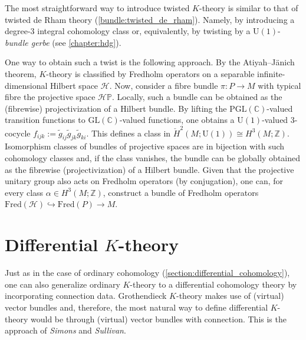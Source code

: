    The most straightforward way to introduce twisted $K$-theory is similar to that of twisted de Rham theory (\cref{bundle:twisted_de_rham}). Namely, by introducing a degree-3 integral cohomology class or, equivalently, by twisting by a $\mathrm{U}(1)$-\textit{bundle gerbe} (see \cref{chapter:hdg}).

    One way to obtain such a twist is the following approach. By the Atiyah--J\"anich theorem, $K$-theory is classified by Fredholm operators on a separable infinite-dimensional Hilbert space $\mathcal{H}$. Now, consider a fibre bundle $\pi:P\rightarrow M$ with typical fibre the projective space $\mathcal{H}\mathbb{P}$. Locally, such a bundle can be obtained as the (fibrewise) projectivization of a Hilbert bundle. By lifting the $\mathrm{PGL}(\mathbb{C})$-valued transition functions to $\mathrm{GL}(\mathbb{C})$-valued functions, one obtains a $\mathrm{U}(1)$-valued 3-cocycle $f_{ijk}:=\widetilde{g}_{ij}\widetilde{g}_{jk}\widetilde{g}_{ki}$. This defines a class in $\check{H}^2(M;\mathrm{U}(1))\cong H^3(M;\mathbb{Z})$. Isomorphism classes of bundles of projective spaces are in bijection with such cohomology classes and, if the class vanishes, the bundle can be globally obtained as the fibrewise (projectivization) of a Hilbert bundle. Given that the projective unitary group also acts on Fredholm operators (by conjugation), one can, for every class $\alpha\in H^3(M;\mathbb{Z})$, construct a bundle of Fredholm operators $\mathrm{Fred}(\mathcal{H})\hookrightarrow\mathrm{Fred}(P)\rightarrow M$.


\section{\texorpdfstring{Differential $K$-theory}{Differential K-theory}}

    Just as in the case of ordinary cohomology (\cref{section:differential_cohomology}), one can also generalize ordinary $K$-theory to a differential cohomology theory by incorporating connection data. Grothendieck $K$-theory makes use of (virtual) vector bundles and, therefore, the most natural way to define differential $K$-theory would be through (virtual) vector bundles with connection. This is the approach of \textit{Simons} and \textit{Sullivan}.

